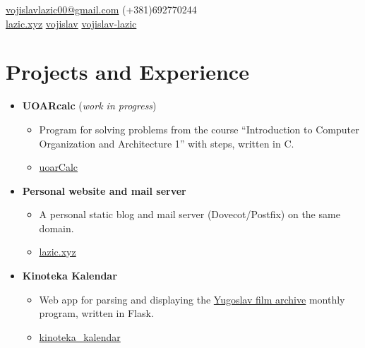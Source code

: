 \documentclass[11pt,a4paper,roman]{moderncv}        %
\begin{document}
\makecvtitle
\vspace*{-23mm}

\begin{center}
	\faEnvelopeO\enspace \href{mail:vojislavlazic00@gmail.com}{vojislavlazic00@gmail.com} \enspace \faMobile\enspace (+381)692770244 \\
	\faGlobe\enspace \href{https://lazic.xyz}{lazic.xyz} \enspace
	\faGithub\enspace \href{https://github.com/vojislav}{vojislav} \enspace
	\faLinkedinSquare\enspace \href{https://www.linkedin.com/in/vojislav-lazic/}{vojislav-lazic}
\end{center}

\section{Projects and Experience}
\begin{itemize}
	\item[] \textbf{UOARcalc} (\textit{work in progress})
		\begin{itemize}
			\item[] Program for solving problems from the course ``Introduction to Computer Organization and Architecture 1'' with steps, written in C.
			\item[] \faGithub \href{https://github.com/vojislav/uoarCalc}{ uoarCalc}
	 	\end{itemize}

	\item[] \textbf{Personal website and mail server}
		\begin{itemize}
			\item[] A personal static blog and mail server (Dovecot/Postfix) on the same domain.
			\item[] \faGlobe \href{https://lazic.xyz}{ lazic.xyz}
	 	\end{itemize}

	\item[] \textbf{Kinoteka Kalendar}
		\begin{itemize}
			\item[] Web app for parsing and displaying the \href{http://kinoteka.org.rs}{Yugoslav film archive} monthly program, written in Flask.
			\item[] \faGithub \href{https://github.com/vojislav/kinoteka\_kalendar}{ kinoteka\_kalendar}
	 	\end{itemize}
\end{itemize}
\end{document}
